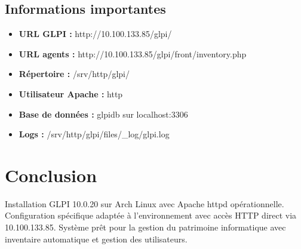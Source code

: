 \documentclass[12pt,a4paper]{article}
\begin{document}
\subsection{Informations importantes}
\begin{itemize}
    \item \textbf{URL GLPI :} http://10.100.133.85/glpi/
    \item \textbf{URL agents :} http://10.100.133.85/glpi/front/inventory.php
    \item \textbf{Répertoire :} /srv/http/glpi/
    \item \textbf{Utilisateur Apache :} http
    \item \textbf{Base de données :} glpidb sur localhost:3306
    \item \textbf{Logs :} /srv/http/glpi/files/\_log/glpi.log
\end{itemize}

\section{Conclusion}

Installation GLPI 10.0.20 sur Arch Linux avec Apache httpd opérationnelle. Configuration spécifique adaptée à l'environnement avec accès HTTP direct via 10.100.133.85. Système prêt pour la gestion du patrimoine informatique avec inventaire automatique et gestion des utilisateurs.
\end{document}
